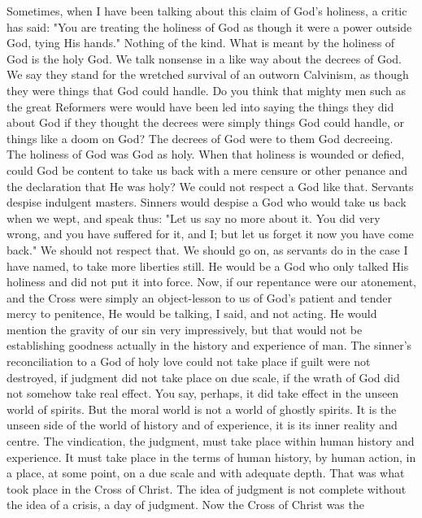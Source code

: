 \documentclass[draft]{ptfdoc}
\begin{document}
Sometimes, when I have been talking about 
this claim of God's holiness, a critic has said: 
"You are treating the holiness of God as 
though it were a power outside God, tying 
His hands." Nothing of the kind. What is 
meant by the holiness of God is the holy 
God. We talk nonsense in a like way about 
the decrees of God. We say they stand for 
the wretched survival of an outworn Calvinism, 
as though they were things that God 
could handle. Do you think that mighty men 
such as the great Reformers were would have 
been led into saying the things they did about 
God if they thought the decrees were simply 
things God could handle, or things like a doom 
on God? The decrees of God were to them God 
decreeing. The holiness of God was God as holy. 
When that holiness is wounded or defied, could 
God be content to take us back with a mere 
censure or other penance and the declaration 
that He was holy? We could not respect a God 
like that. Servants despise indulgent masters. 
Sinners would despise a God who would take us 
back when we wept, and speak thus: "Let us 
say no more about it. You did very wrong, and 
you have suffered for it, and I; but let us forget 
it now you have come back." We should not 
respect that. We should go on, as servants do in 
the case I have named, to take more liberties 
still. He would be a God who only talked His 
holiness and did not put it into force. Now, if 
our repentance were our atonement, and the 
Cross were simply an object-lesson to us of 
God's patient and tender mercy to penitence, 
He would be talking, I said, and not acting. He 
would mention the gravity of our sin very impressively, 
but that would not be establishing 
goodness actually in the history and experience 
of man. The sinner's reconciliation to a God 
of holy love could not take place if guilt 
were not destroyed, if judgment did not take 
place on due scale, if the wrath of God did 
not somehow take real effect. You say, perhaps, 
it did take effect in the unseen world 
of spirits. But the moral world is not a world 
of ghostly spirits. It is the unseen side of the 
world of history and of experience, it is its 
inner reality and centre. The vindication, the 
judgment, must take place within human history 
and experience. It must take place in the 
terms of human history, by human action, in a 
place, at some point, on a due scale and with adequate 
depth. That was what took place in the 
Cross of Christ. The idea of judgment is not 
complete without the idea of a crisis, a day of 
judgment. Now the Cross of Christ was the 
\end{document}
